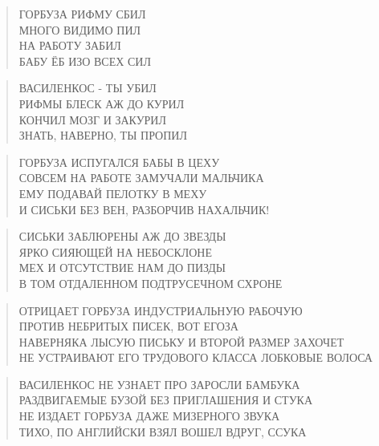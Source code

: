 \poemtitle{***}
\begin{verse}
ГОРБУЗА РИФМУ СБИЛ\\
МНОГО ВИДИМО ПИЛ\\
НА РАБОТУ ЗАБИЛ\\
БАБУ ЁБ ИЗО ВСЕХ СИЛ
\end{verse}

\poemtitle{***}
\begin{verse}
ВАСИЛЕНКОС - ТЫ УБИЛ\\
РИФМЫ БЛЕСК АЖ ДО КУРИЛ\\
КОНЧИЛ МОЗГ И ЗАКУРИЛ\\
ЗНАТЬ, НАВЕРНО, ТЫ ПРОПИЛ
\end{verse}

\poemtitle{***}
\begin{verse}
ГОРБУЗА ИСПУГАЛСЯ БАБЫ В ЦЕХУ\\
СОВСЕМ НА РАБОТЕ ЗАМУЧАЛИ МАЛЬЧИКА\\
ЕМУ ПОДАВАЙ ПЕЛОТКУ В МЕХУ\\
И СИСЬКИ БЕЗ ВЕН, РАЗБОРЧИВ НАХАЛЬЧИК!
\end{verse}

\poemtitle{***}
\begin{verse}
СИСЬКИ ЗАБЛЮРЕНЫ АЖ ДО ЗВЕЗДЫ\\
ЯРКО СИЯЮЩЕЙ НА НЕБОСКЛОНЕ\\
МЕХ И ОТСУТСТВИЕ НАМ ДО ПИЗДЫ\\
В ТОМ ОТДАЛЕННОМ ПОДТРУСЕЧНОМ СХРОНЕ
\end{verse}

\poemtitle{***}
\begin{verse}
ОТРИЦАЕТ ГОРБУЗА ИНДУСТРИАЛЬНУЮ РАБОЧУЮ\\
ПРОТИВ НЕБРИТЫХ ПИСЕК, ВОТ ЕГОЗА\\
НАВЕРНЯКА ЛЫСУЮ ПИСЬКУ И ВТОРОЙ РАЗМЕР ЗАХОЧЕТ\\
НЕ  УСТРАИВАЮТ ЕГО ТРУДОВОГО КЛАССА ЛОБКОВЫЕ ВОЛОСА
\end{verse}

\poemtitle{***}
\begin{verse}
ВАСИЛЕНКОС НЕ УЗНАЕТ ПРО ЗАРОСЛИ БАМБУКА\\
РАЗДВИГАЕМЫЕ БУЗОЙ БЕЗ ПРИГЛАШЕНИЯ И СТУКА\\
НЕ ИЗДАЕТ ГОРБУЗА ДАЖЕ МИЗЕРНОГО ЗВУКА\\
ТИХО, ПО АНГЛИЙСКИ ВЗЯЛ ВОШЕЛ ВДРУГ, ССУКА
\end{verse}

